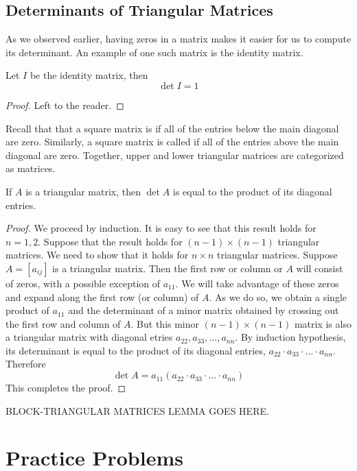 \documentclass{ximera}
\begin{document}
\subsection*{Determinants of Triangular Matrices}
As we observed earlier, having zeros in a matrix makes it easier for us to compute its determinant.  An example of one such matrix is the identity matrix.
\begin{lemma}\label{lemma:detofid} Let $I$ be the identity matrix, then
 $$\det{I}=1$$
 \end{lemma}
 \begin{proof} Left to the reader.
 \end{proof}

Recall that that a square matrix is  if all of the entries below the main diagonal are zero.  Similarly, a square matrix is called  if all of the entries above the main diagonal are zero.  Together, upper and lower triangular matrices are categorized as  matrices.

\begin{lemma}\label{lemma:triangulardet}
If $A$ is a triangular matrix, then $\det{A}$ is equal to the product of its diagonal entries.
\end{lemma}
\begin{proof}
We proceed by induction.  It is easy to see that this result holds for $n=1, 2$.  Suppose that the result holds for $(n-1)\times (n-1)$ triangular matrices.  We need to show that it holds for $n\times n$ triangular matrices.  Suppose $A=[a_{ij}]$ is a triangular matrix. 
 Then the first row or column or $A$ will consist of zeros, with a possible exception of $a_{11}$.  We will take advantage of these zeros and expand along the first row (or column) of $A$.  As we do so, we obtain a single product of $a_{11}$ and the determinant of a minor matrix obtained by crossing out the first row and column of $A$.  But this minor $(n-1)\times (n-1)$ matrix is also a triangular matrix with diagonal etries $a_{22}, a_{33},\ldots, a_{nn}$.  By induction hypothesis, its determinant is equal to the product of its diagonal entries, $a_{22}\cdot a_{33}\cdot\ldots\cdot a_{nn}$.  Therefore $$\det{A}=a_{11}(a_{22}\cdot a_{33}\cdot\ldots\cdot a_{nn})$$
 This completes the proof.
\end{proof}

BLOCK-TRIANGULAR MATRICES LEMMA GOES HERE.

\section*{Practice Problems}
\end{document}
